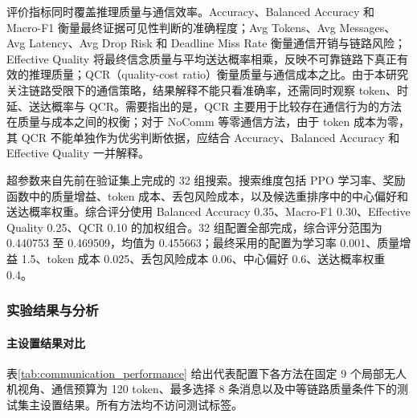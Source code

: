 评价指标同时覆盖推理质量与通信效率。Accuracy、Balanced Accuracy 和 Macro-F1 衡量最终证据可见性判断的准确程度；Avg Tokens、Avg Messages、Avg Latency、Avg Drop Risk 和 Deadline Miss Rate 衡量通信开销与链路风险；Effective Quality 将最终信念质量与平均送达概率相乘，反映不可靠链路下真正有效的推理质量；QCR（quality-cost ratio）衡量质量与通信成本之比。由于本研究关注链路受限下的通信策略，结果解释不能只看准确率，还需同时观察 token、时延、送达概率与 QCR。需要指出的是，QCR 主要用于比较存在通信行为的方法在质量与成本之间的权衡；对于 NoComm 等零通信方法，由于 token 成本为零，其 QCR 不能单独作为优劣判断依据，应结合 Accuracy、Balanced Accuracy 和 Effective Quality 一并解释。

超参数来自先前在验证集上完成的 32 组搜索。搜索维度包括 PPO 学习率、奖励函数中的质量增益、token 成本、丢包风险成本，以及候选重排序中的中心偏好和送达概率权重。综合评分使用 Balanced Accuracy 0.35、Macro-F1 0.30、Effective Quality 0.25、QCR 0.10 的加权组合。32 组配置全部完成，综合评分范围为 0.440753 至 0.469509，均值为 0.455663；最终采用的配置为学习率 0.001、质量增益 1.5、token 成本 0.025、丢包风险成本 0.06、中心偏好 0.6、送达概率权重 0.4。

\subsubsection{实验结果与分析}
\paragraph{主设置结果对比}
表\ref{tab:communication_performance} 给出代表配置下各方法在固定 9 个局部无人机视角、通信预算为 120 token、最多选择 8 条消息以及中等链路质量条件下的测试集主设置结果。所有方法均不访问测试标签。

